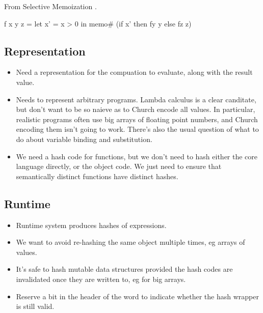 From Selective Memoization \cite{Acar:2003:SelectiveMemoization}.
\begin{code}
f x y z
 = let x' = x > 0 in
   memo# (if x' then fy y else fz z)
\end{code}



\subsection{Representation}

\begin{itemize}
\item   Need a representation for the compuation to evaluate, along with the result value.
\item   Needs to represent arbitrary programs. Lambda calculus is a clear canditate,
        but don't want to be so naieve as to Church encode all values. In particular, realistic programs often use big arrays of floating point numbers, and Church encoding them isn't going to work. There's also the usual question of what to do about variable binding and substitution.
\item   We need a hash code for functions, but we don't need to hash either the core language directly, or the object code. We just need to ensure that semantically distinct functions have distinct hashes.
\end{itemize}


\subsection{Runtime}
\begin{itemize}
\item   Runtime system produces hashes of expressions.
\item   We want to avoid re-hashing the same object multiple times, eg arrays of values.
\item   It's safe to hash mutable data structures provided the hash codes are invalidated once they are written to, eg for big arrays.
\item   Reserve a bit in the header of the word to indicate whether the hash wrapper is still valid.

\end{itemize}